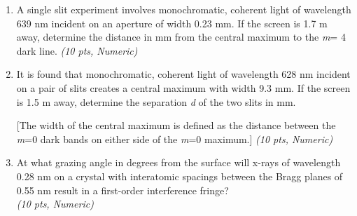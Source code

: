 \documentclass[11pt]{article}
\begin{document}
\begin{enumerate}[leftmargin=*]
  \item A single slit experiment involves monochromatic, coherent light of wavelength 639 nm incident on an aperture of width 0.23 mm. If the screen is 1.7 m away, determine the distance in mm from the central maximum to the \emph{m}= 4 dark line. \hfill \textit{(10 pts, Numeric)}

  \item It is found that monochromatic, coherent light of wavelength 628 nm incident on a pair of slits creates a central maximum with width 9.3 mm. If the screen is 1.5 m away, determine the separation \emph{d} of the two slits in mm.

[The width of the central maximum is defined as the distance between the \emph{m}=0 dark bands on either side of the \emph{m}=0 maximum.] \hfill \textit{(10 pts, Numeric)}

  \item At what grazing angle in degrees from the surface will x-rays of wavelength 0.28 nm on a crystal with interatomic spacings between the Bragg planes of 0.55 nm result in a first-order interference fringe? \\ \hfill \textit{(10 pts, Numeric)}

\end{enumerate}
\end{document}
